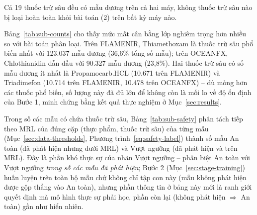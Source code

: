 \documentclass[10pt,twocolumn,twoside]{article}
\begin{document}
\begin{table}[htbp]
\vspace{2pt}
{\footnotesize Cả 19 thuốc trừ sâu đều có mẫu dương trên cả hai máy, không
thuốc trừ sâu nào bị loại hoàn toàn khỏi bài toán (2) trên bất kỳ máy nào.}
\end{table}

Bảng~\ref{tab:sub-counts} cho thấy mức mất cân bằng lớp nghiêm trọng hơn
nhiều so với bài toán phân loại. Trên FLAMENIR, Thiamethoxam là thuốc trừ
sâu phổ biến nhất với 123.037 mẫu dương (36,6\% tổng số mẫu); trên
OCEANFX, Chlothianidin dẫn đầu với 90.327 mẫu dương (23,8\%). Hai thuốc trừ
sâu có số mẫu dương ít nhất là Propamocarb.HCL (10.671 trên FLAMENIR) và
Triadimefon (10.714 trên FLAMENIR, 10.478 trên OCEANFX) -- dù mỏng hơn các
thuốc phổ biến, số lượng này đã đủ lớn để không còn là mối lo về độ ổn định
của Bước 1, minh chứng bằng kết quả thực nghiệm ở Mục~\ref{sec:results}.

Trong số các mẫu có chứa thuốc trừ sâu, Bảng~\ref{tab:sub-safety} phân tách
tiếp theo MRL của đúng cặp (thực phẩm, thuốc trừ sâu) của từng mẫu
(Mục~\ref{sec:data-thresholds}, Phương trình~\ref{eq:safety-label}) thành
số mẫu An toàn (đã phát hiện nhưng dưới MRL) và Vượt ngưỡng (đã phát hiện và
trên MRL). Đây là phần khó thực sự của nhãn Vượt ngưỡng -- phân biệt An
toàn với Vượt ngưỡng \emph{trong số các mẫu đã phát hiện}; Bước 2
(Mục~\ref{sec:stage-training}) huấn luyện trên toàn bộ mẫu chứ không chỉ tập
con này (mẫu không phát hiện được gộp thẳng vào An toàn), nhưng phần thông
tin ở bảng này mới là ranh giới quyết định mà mô hình thực sự phải học,
phần còn lại (không phát hiện $\Rightarrow$ An toàn) gần như hiển nhiên.
\end{document}

